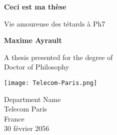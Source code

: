 \begin{titlepage}
    \begin{center}
        \vspace*{1cm}
        
        \Huge
        \textbf{Ceci est ma th\`ese}
        
        \vspace{0.5cm}
        \LARGE
        Vie amoureuse des t\'etards \`a Ph7
        
        \vspace{1.5cm}
        
        \textbf{Maxime Ayrault}
        
        \vfill
        
        A thesis presented for the degree of\\
        Doctor of Philosophy
        
        \vspace{0.8cm}
        
        \texttt{[image: Telecom-Paris.png]}
        
        \Large
        Department Name\\
        Telecom Paris\\
        France\\
        30 f\'evrier 2056
        
    \end{center}
\end{titlepage}